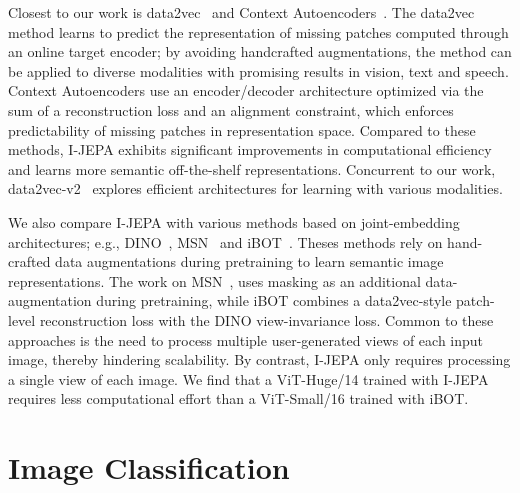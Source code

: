 \documentclass[10pt,twocolumn,letterpaper]{article}
\newcommand{\putalg}{{I-JEPA}\xspace}
\begin{document}
Closest to our work is data2vec~\cite{baevski2022data2vec} and Context Autoencoders~\cite{chen2021empirical}.
The data2vec method learns to predict the representation of missing patches computed through an online target encoder; by avoiding handcrafted augmentations, the method can be applied to diverse modalities with promising results in vision, text and speech.
Context Autoencoders use an encoder/decoder architecture optimized via the sum of a reconstruction loss and an alignment constraint, which enforces predictability of missing patches in representation space.
Compared to these methods, \putalg exhibits significant improvements in computational efficiency and learns more semantic off-the-shelf representations.
Concurrent to our work, data2vec-v2~\cite{baevski2022efficient} explores efficient architectures for learning with various modalities.


We also compare \putalg with various methods based on joint-embedding architectures; e.g., DINO~\cite{caron2021emerging}, MSN~\cite{assran2022masked} and iBOT~\cite{zhou2021ibotyes}.
Theses methods rely on hand-crafted data augmentations during pretraining to learn semantic image representations.
The work on MSN~\cite{assran2022masked}, uses masking as an additional data-augmentation during pretraining, while iBOT combines a data2vec-style patch-level reconstruction loss with the DINO view-invariance loss.
Common to these approaches is the need to process multiple user-generated views of each input image, thereby hindering scalability.
By contrast, \putalg only requires processing a single view of each image.
We find that a ViT-Huge/14 trained with \putalg requires less computational effort than a ViT-Small/16 trained with iBOT.

\section{Image Classification}
\label{sec:classification}
\end{document}
